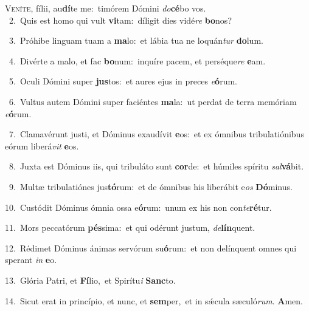 \lettrine{\initial\textcolor{\initialcolor}{V}}{eníte,} fílii, au\-\textbf{dí}\-te me:~\star timórem Dómini \textit{do}\-\textbf{cé}bo vos.\\
{\numbfont\textcolor{\numbcolor}{~2.}}~Quis est homo qui vult \textbf{vi}\-tam:~\star díligit dies vidé\textit{re} \textbf{bo}\-nos?\par
{\numbfont\textcolor{\numbcolor}{~3.}}~Próhibe linguam tuam a \textbf{ma}\-lo:~\star et lábia tua ne loquán\textit{tur} \textbf{do}\-lum.\par
{\numbfont\textcolor{\numbcolor}{~4.}}~Divérte a malo, et fac \textbf{bo}\-num:~\star inquíre pacem, et perséque\textit{re} \textbf{e}\-am.\par
{\numbfont\textcolor{\numbcolor}{~5.}}~Oculi Dómini super \textbf{jus}\-tos:~\star et aures ejus in preces \textit{e}\-\textbf{ó}rum.\par
{\numbfont\textcolor{\numbcolor}{~6.}}~Vultus autem Dómini super faciéntes \textbf{ma}\-la:~\star ut perdat de terra memóriam \textit{e}\-\textbf{ó}rum.\par
{\numbfont\textcolor{\numbcolor}{~7.}}~Clamavérunt justi, et Dóminus exaudívit \textbf{e}\-os:~\star et ex ómnibus tribulatiónibus eórum liberá\textit{vit} \textbf{e}\-os.\par
{\numbfont\textcolor{\numbcolor}{~8.}}~Juxta est Dóminus iis, qui tribuláto sunt \textbf{cor}\-de:~\star et húmiles spíritu \textit{sal}\-\textbf{vá}bit.\par
{\numbfont\textcolor{\numbcolor}{~9.}}~Multæ tribulatiónes jus\-\textbf{tó}\-rum:~\star et de ómnibus his liberábit e\textit{os} \textbf{Dó}\-minus.\par
{\numbfont\textcolor{\numbcolor}{10.}}~Custódit Dóminus ómnia ossa e\-\textbf{ó}\-rum:~\star unum ex his non con\-\textit{te}\-\textbf{ré}tur.\par
{\numbfont\textcolor{\numbcolor}{11.}}~Mors peccatórum \textbf{pés}\-sima:~\star et qui odérunt justum, \textit{de}\-\textbf{lín}quent.\par
{\numbfont\textcolor{\numbcolor}{12.}}~Rédimet Dóminus ánimas servórum su\-\textbf{ó}\-rum:~\star et non delínquent omnes qui sperant \textit{in} \textbf{e}\-o.\par
{\numbfont\textcolor{\numbcolor}{13.}}~Glória Patri, et \textbf{Fí}\-lio,~\star et Spirítu\textit{i} \textbf{Sanc}\-to.\par
{\numbfont\textcolor{\numbcolor}{14.}}~Sicut erat in princípio, et nunc, et \textbf{sem}\-per,~\star et in sǽcula sæculó\-\textit{rum}\-. \textbf{A}\-men.\par
